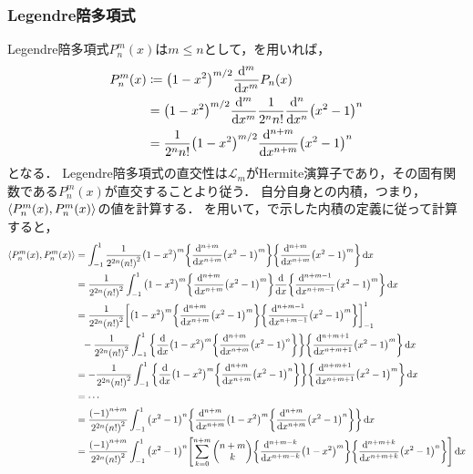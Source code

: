 \documentclass{report}
\begin{document}
    \subsubsection{Legendre陪多項式}
      Legendre陪多項式$P_n^m(x)$は$m \leq n$として，を用いれば，
      \begin{align}
        P_n^m(x) &\coloneqq \qty(1 - x^2)^{m/2}\dv[m]{x}P_n(x) \\ 
        &= \qty(1 - x^2)^{m/2}\dv[m]{x}\frac{1}{2^nn!}\dv[n]{x}\qty(x^2 - 1)^n \\ 
        &= \frac{1}{2^nn!}\qty(1 - x^2)^{m/2}\dv[n + m]{x}\qty(x^2 - 1)^n \label{assos-legendre-polynominal}
      \end{align}
      となる．
      Legendre陪多項式の直交性は$\mathcal{L}_m$がHermite演算子であり，その固有関数である$P_n^m(x)$が直交することより従う．
      自分自身との内積，つまり，$\left\langle P_n^m(x), P_n^m(x) \right\rangle$の値を計算する．
      を用いて，で示した内積の定義に従って計算すると，
      \begin{align}
        \inner{P_{n}^m(x)}{P_{n}^m(x)} &= \int_{-1}^{1}\frac{1}{2^{2n}\qty(n!)^2}\qty(1 - x^2)^m \qty{\dv[n + m]{x}\qty(x^2 - 1)^m}\qty{\dv[n + m]{x}\qty(x^2 - 1)^m} \dd{x} \\ 
        &= \frac{1}{2^{2n}\qty(n!)^2}\int_{-1}^{1}\qty(1 - x^2)^m \qty{\dv[n + m]{x}\qty(x^2 - 1)^m}\dv{x}\qty{\dv[n + m - 1]{x}\qty(x^2 - 1)^m} \dd{x} \\ 
        &= \frac{1}{2^{2n}\qty(n!)^2}\qty[\qty(1 - x^2)^m\qty{\dv[n + m]{x}\qty(x^2 - 1)^m}\qty{\dv[n + m - 1]{x}\qty(x^2 - 1)^m}]_{-1}^{1} \\ 
        &\ \ -\frac{1}{2^{2n}\qty(n!)^2} \int_{-1}^{1}\qty{\dv{x}\qty(1 - x^2)^m\qty{\dv[n + m]{x}(x^2 - 1)^n}}\qty{\dv[n + m + 1]{x}\qty(x^2 - 1)^m}\dd{x} \\ 
        &= -\frac{1}{2^{2n}\qty(n!)^2}\int_{-1}^{1}\qty{\dv{x}\qty(1 - x^2)^m\qty{\dv[n + m]{x}(x^2 - 1)^n}}\qty{\dv[n + m + 1]{x}\qty(x^2 - 1)^m} \dd{x} \\
        &= \cdots \\ 
        &= \frac{\qty(-1)^{n + m}}{2^{2n}\qty(n!)^2}\int_{-1}^{1}\qty(x^2 - 1)^n\qty{\dv[n + m]{x}\qty(1 - x^2)^m\qty{\dv[n + m]{x}\qty(x^2 - 1)^n}} \dd{x} \\ 
        &= \frac{\qty(-1)^{n + m}}{2^{2n}\qty(n!)^2}\int_{-1}^{1}\qty(x^2 - 1)^n\qty[\sum_{k = 0}^{n + m}\mqty(n + m \\ k)\qty{\dv[n + m - k]{x}\qty(1 - x^2)^m}\qty{\dv[n + m + k]{x}\qty(x^2 - 1)^n}] \dd{x}\label{use-leibniz-formula}
      \end{align}
\end{document}
